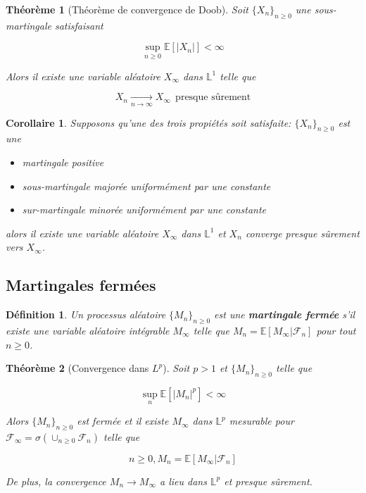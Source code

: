 \documentclass[10pt,a4paper,oneside]{article}
\newtheorem{theoreme}{Théorème}
\newtheorem{corollaire}{Corollaire}
\newtheorem{definition}{Définition}
\begin{document}
\begin{theoreme}[Théorème de convergence de Doob]
Soit $\{ X_n \}_{n \geq 0}$ une sous-martingale satisfaisant

\[ \sup_{n \geq 0} \mathbb{E}[|X_n|] < \infty \]

Alors il existe une variable aléatoire $X_\infty$ dans $\mathbb{L}^1$ telle que

\[ X_n \underset{n \to \infty}{\longrightarrow} X_\infty\ \ \text{presque sûrement} \]
\end{theoreme}

\begin{corollaire}
Supposons qu'une des trois propiétés soit satisfaite: $\{ X_n \}_{n \geq 0}$ est une

\begin{itemize}
\item
martingale positive
\item
sous-martingale majorée uniformément par une constante
\item
sur-martingale minorée uniformément par une constante
\end{itemize}

alors il existe une variable aléatoire $X_\infty$ dans $\mathbb{L}^1$ et $X_n$ converge presque sûrement vers $X_\infty$.
\end{corollaire}

\subsection{Martingales fermées}

\begin{definition}
Un processus aléatoire $\{ M_n \}_{n \geq 0}$ est une \textbf{martingale fermée} s'il existe une variable aléatoire intégrable $M_\infty$ telle que $M_n = \mathbb{E}[M_\infty | \mathcal{F}_n]$ pour tout $n \geq 0$.
\end{definition}

\begin{theoreme}[Convergence dans $L^p$]
Soit $p > 1$ et $\{ M_n \}_{n \geq 0}$ telle que

\[ \sup_{n} \mathbb{E}[|M_n|^p] < \infty \]

Alors $\{ M_n \}_{n \geq 0}$ est fermée et il existe $M_\infty$ dans $\mathbb{L}^p$ mesurable pour $\mathcal{F}_\infty = \sigma(\cup_{n \geq 0} \mathcal{F}_n)$ telle que

\[ n \geq 0, M_n = \mathbb{E}[M_\infty | \mathcal{F}_n] \]

De plus, la convergence $M_n \to M_\infty$ a lieu dans $\mathbb{L}^p$ et presque sûrement.
\end{theoreme}
\end{document}

